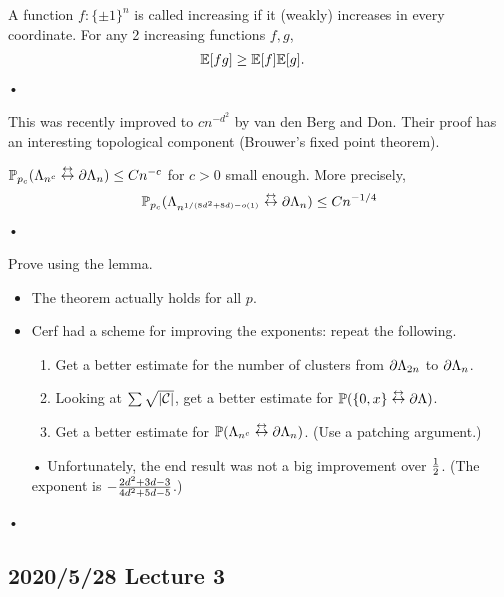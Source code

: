 \begin{thm}
A function $f:\{\pm1\}^n$ is called increasing if it (weakly) increases in every coordinate. For any 2 increasing functions $f,g$, 
\begin{align*}
\mathbb{E}[fg] &\ge \mathbb{E}[f]\mathbb{E}[g].
\end{align*}•
\end{thm}


This was recently improved to $cn^{-d^2}$ by van den Berg and Don.
Their proof has an interesting topological component (Brouwer's fixed point theorem).


\begin{thm}[Cerf, 2015]
$\mathbb{P}_{p_c}(\Lambda_{n^c} \stackrel {\leftrightarrow}{\leftrightarrow} \partial \Lambda_n) \le Cn^{-c}$ for $c>0$ small enough.
More precisely, 
\begin{align*}
\mathbb{P}_{p_c}(\Lambda_{n^{1/(8d^2+8d)-o(1)}} \stackrel {\leftrightarrow}{\leftrightarrow} \partial \Lambda_n) \le Cn^{-1/4}
\end{align*}•
\end{thm}
Prove using the lemma.
\begin{itemize}
\item
The theorem actually holds for all $p$.
\item
Cerf had a scheme for improving the exponents: repeat the following.
\begin{enumerate}
\item
Get a better estimate for the number of clusters from $\partial \Lambda_{2n}$ to $\partial \Lambda_n$.
\item
Looking at $\sum \sqrt{|\mathcal{C}|}$, get a better estimate for $\mathbb{P}(\{0,x\}\stackrel {\leftrightarrow}{\leftrightarrow} \partial \Lambda)$. 
\item
Get a better estimate for $\mathbb{P}(\Lambda_{n^c} \stackrel {\leftrightarrow}{\leftrightarrow} \partial \Lambda_n)$. (Use a patching argument.)
\end{enumerate}•
Unfortunately, the end result was not a big improvement over $\frac{1}{2}$.
(The exponent is $-\frac{2d^2+3d-3}{4d^2+5d-5}$.)
\end{itemize}•



\subsection*{2020/5/28 Lecture 3}

